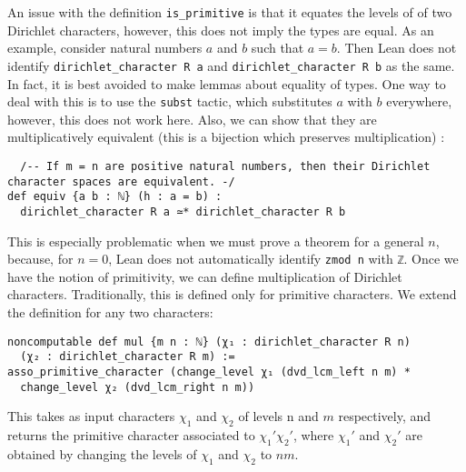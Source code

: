 \documentclass[a4paper,UKenglish,cleveref, autoref, thm-restate]{lipics-v2021}
\newcommand{\lean}[1]{\texttt{#1}\xspace} %
\begin{document}
An issue with the definition \lean{is\_primitive} is that it equates the levels of of two Dirichlet characters, 
however, this does not imply the types are equal. As an example, consider natural numbers $a$ and $b$ such that 
$a = b$. Then Lean does not identify \lean{dirichlet\_character R a} and \lean{dirichlet\_character R b} as the 
same. In fact, it is best avoided to make lemmas about equality of types. One way to deal with this is to use 
the \lean{subst} tactic, which substitutes $a$ with $b$ everywhere, however, this does not work here. Also, we 
can show that they are multiplicatively equivalent (this is a bijection which preserves multiplication) : 
\begin{lstlisting}
  /-- If m = n are positive natural numbers, then their Dirichlet character spaces are equivalent. -/
def equiv {a b : ℕ} (h : a = b) :
  dirichlet_character R a ≃* dirichlet_character R b
\end{lstlisting}

This is especially problematic when we must prove a theorem for a general $n$, because, for $n = 0$, Lean does 
not automatically identify \lean{zmod n} with \lean{ℤ}. 
Once we have the notion of primitivity, we can define multiplication of Dirichlet characters. Traditionally, this is 
defined only for primitive characters. We extend the definition for any two characters: 
\begin{lstlisting}
noncomputable def mul {m n : ℕ} (χ₁ : dirichlet_character R n) 
  (χ₂ : dirichlet_character R m) :=
asso_primitive_character (change_level χ₁ (dvd_lcm_left n m) * 
  change_level χ₂ (dvd_lcm_right n m))
\end{lstlisting}
This takes as input characters $\chi_1$ and $\chi_2$ of levels n and $m$ respectively, and returns the primitive 
character associated to $\chi_1' \chi_2'$, where $\chi_1'$ and $\chi_2'$ are obtained by changing the levels 
of $\chi_1$ and $\chi_2$ to $n m$. 
\end{document}
